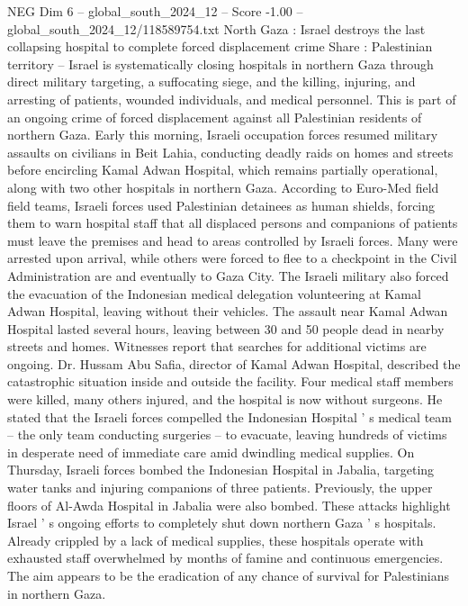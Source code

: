 \begin{textsample}{NEG Dim 6 – global\_south\_2024\_12 – Score -1.00 – global\_south\_2024\_12/118589754.txt}  \label{ex:f6_neg_028}
North Gaza : Israel destroys the last collapsing hospital to complete forced displacement crime Share : Palestinian territory -- Israel is systematically closing hospitals in northern Gaza through direct military targeting, a suffocating siege, and the killing, injuring, and arresting of patients, wounded individuals, and medical personnel.
This is part of an ongoing crime of forced displacement against all Palestinian residents of northern Gaza.
Early this morning, Israeli occupation forces resumed military assaults on civilians in Beit Lahia, conducting deadly raids on homes and streets before encircling Kamal Adwan Hospital, which remains partially operational, along with two other hospitals in northern Gaza.
According to Euro-Med field field teams, Israeli forces used Palestinian detainees as human shields, forcing them to warn hospital staff that all displaced persons and companions of patients must leave the premises and head to areas controlled by Israeli forces.
Many were arrested upon arrival, while others were forced to flee to a checkpoint in the Civil Administration are and eventually to Gaza City.
The Israeli military also forced the evacuation of the Indonesian medical delegation volunteering at Kamal Adwan Hospital, leaving without their vehicles.
The assault near Kamal Adwan Hospital lasted several hours, leaving between 30 and 50 people dead in nearby streets and homes.
Witnesses report that searches for additional victims are ongoing.
Dr.
Hussam Abu Safia, director of Kamal Adwan Hospital, described the catastrophic situation inside and outside the facility.
Four medical staff members were killed, many others injured, and the hospital is now without surgeons.
He stated that the Israeli forces compelled the Indonesian Hospital ' s medical team -- the only team conducting surgeries -- to evacuate, leaving hundreds of victims in desperate need of immediate care amid dwindling medical supplies.
On Thursday, Israeli forces bombed the Indonesian Hospital in Jabalia, targeting water tanks and injuring companions of three patients.
Previously, the upper floors of Al-Awda Hospital in Jabalia were also bombed.
These attacks highlight Israel ' s ongoing efforts to completely shut down northern Gaza ' s hospitals.
Already crippled by a lack of medical supplies, these hospitals operate with exhausted staff overwhelmed by months of famine and continuous emergencies.
The aim appears to be the eradication of any chance of survival for Palestinians in northern Gaza.

\end{textsample}
